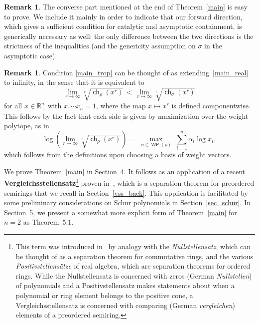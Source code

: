 \documentclass[11pt]{article}
\theoremstyle{definition}
\newtheorem{rema}[theo]{Remark}
\numberwithin{equation}{section}
\newcommand{\R}{\mathbb{R}}
\DeclareMathOperator{\chr}{\mathsf{ch}}
\DeclareMathOperator{\WP}{\mathsf{WP}}
\newcommand{\newterm}[1]{\textbf{#1}}
\begin{document}
\begin{rema}
	The converse part mentioned at the end of Theorem~\ref{main} is easy to prove. We include it mainly in order to indicate that our forward direction, which gives a sufficient condition for catalytic and asymptotic containment, is generically necessary as well: the only difference between the two directions is the strictness of the inequalities (and the genericity assumption on $\sigma$ in the asymptotic case).
\end{rema}

\begin{rema}
	Condition \ref{main_trop} can be thought of as extending~\ref{main_real} to infinity, in the sense that it is equivalent to
	\begin{equation}
		\label{main_trop_ineq2}
		\lim_{r \to \infty} \sqrt[r]{\chr_\rho(x^r)} \,<\, \lim_{r \to \infty} \sqrt[r]{\chr_\sigma(x^r)}
	\end{equation}
	for all $x \in \R_+^n$ with $x_1 \cdots x_n = 1$, where the map $x \mapsto x^r$ is defined componentwise.
	This follows by the fact that each side is given by maximization over the weight polytope, as in
	\[
		\log \left( \lim_{r \to \infty} \sqrt[r]{\chr_\rho(x^r)} \right) \,=\, \max_{\alpha \in \WP(\rho)} \; \sum_{i=1}^n \alpha_i \log x_i,
	\]
	which follows from the definitions upon choosing a basis of weight vectors.
\end{rema}

We prove Theorem~\ref{main} in Section~4. 
It follows as an application of a recent \newterm{Vergleichsstellensatz}\footnote{This term was introduced in~\cite{vergleichsstellensatz} by analogy with the \emph{Nullstellensatz}, which can be thought of as a separation theorem for commutative rings, and the various \emph{Positivstellens\"atze} of real algebra, which are separation theorems for ordered rings. While the Nullstellensatz is concerned with zeros (German \emph{Nullstellen}) of polynomials and a Positivstellensatz makes statements about when a polynomial or ring element belongs to the positive cone, a Vergleichsstellensatz is concerned with comparing (German \emph{vergleichen}) elements of a preordered semiring.} proven in~\cite{vergleichsstellensatz}, which is a separation theorem for preordered semirings that we recall in Section~\ref{vss_back}.
This application is facilitated by some preliminary considerations on Schur polynomials in Section~\ref{sec_schur}.
In Section~5, we present a somewhat more explicit form of Theorem~\ref{main} for $n = 2$ as Theorem~5.1.
\end{document}
